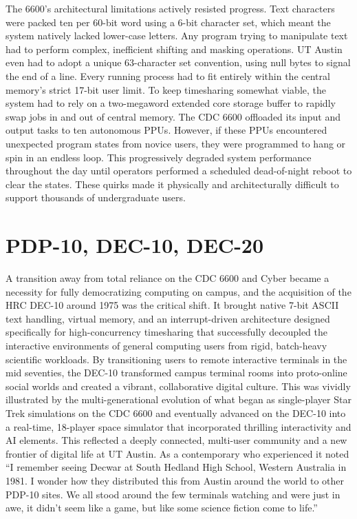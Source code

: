 The 6600’s architectural limitations actively resisted progress. Text characters were packed ten per 60-bit word using a 6-bit character set, which meant the system natively lacked lower-case letters. Any program trying to manipulate text had to perform complex, inefficient shifting and masking operations. UT Austin even had to adopt a unique 63-character set convention, using null bytes to signal the end of a line. Every running process had to fit entirely within the central memory's strict 17-bit user limit. To keep timesharing somewhat viable, the system had to rely on a two-megaword extended core storage buffer to rapidly swap jobs in and out of central memory. The CDC 6600 offloaded its input and output tasks to ten autonomous PPUs. However, if these PPUs encountered unexpected program states from novice users, they were programmed to hang or spin in an endless loop. This progressively degraded system performance throughout the day until operators performed a scheduled dead-of-night reboot to clear the states. These quirks made it physically and architecturally difficult to support thousands of undergraduate users. 

\section{PDP-10, DEC-10, DEC-20}

A transition away from total reliance on the CDC 6600 and Cyber became a necessity for fully democratizing computing on campus, and the acquisition of the HRC DEC-10 around 1975 was the critical shift. It brought native 7-bit ASCII text handling, virtual memory, and an interrupt-driven architecture designed specifically for high-concurrency timesharing that successfully decoupled the interactive environments of general computing users from rigid, batch-heavy scientific workloads. By transitioning users to remote interactive terminals in the mid seventies, the DEC-10 transformed campus terminal rooms into proto-online social worlds and created a vibrant, collaborative digital culture. This was vividly illustrated by the multi-generational evolution of what began as single-player Star Trek simulations on the CDC 6600 and eventually advanced on the DEC-10 into a real-time, 18-player space simulator that incorporated thrilling interactivity and AI elements. This reflected a deeply connected, multi-user community and a new frontier of digital life at UT Austin. As a contemporary who experienced it noted “I remember seeing Decwar at South Hedland High School, Western Australia in 1981. I wonder how they distributed this from Austin around the world to other PDP-10 sites. We all stood around the few terminals watching and were just in awe, it didn’t seem like a game, but like some science fiction come to life.” 


